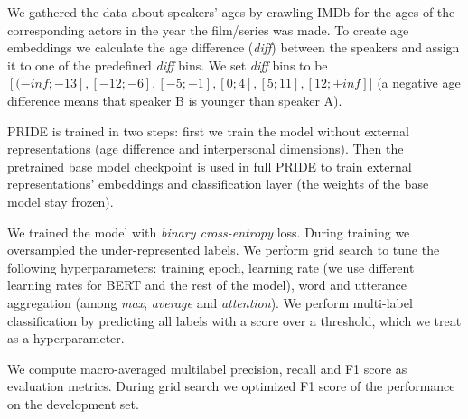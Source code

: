We gathered the data about speakers' ages by crawling \gls{IMDb} for the ages of the corresponding actors in the year the film/series was made. To create age embeddings we calculate the age difference (\emph{diff}) between the speakers and assign it to one of the predefined \emph{diff} bins. We set \emph{diff} bins to be $[(-inf; -13], [-12; -6], [-5; -1], [0; 4], [5; 11], [12; +inf]]$ (a negative age difference means that speaker B is younger than speaker A).

 PRIDE is trained in two steps: first we train the model without external representations (age difference and interpersonal dimensions). Then the pretrained base model checkpoint is used in full PRIDE to train external representations' embeddings and classification layer (the weights of the base model stay frozen).

We trained the model with \textit{binary cross-entropy} loss. During training we oversampled the under-represented labels. We perform grid search to tune the following hyperparameters: training epoch, learning rate (we use different learning rates for BERT and the rest of the model), word and utterance aggregation (among \textit{max}, \textit{average} and \textit{attention}).
We perform multi-label classification by predicting all labels with a score over a threshold, which we treat as a hyperparameter.

 We compute macro-averaged multilabel precision, recall and F1 score as evaluation metrics. During grid search we optimized F1 score of the performance on the development set.

